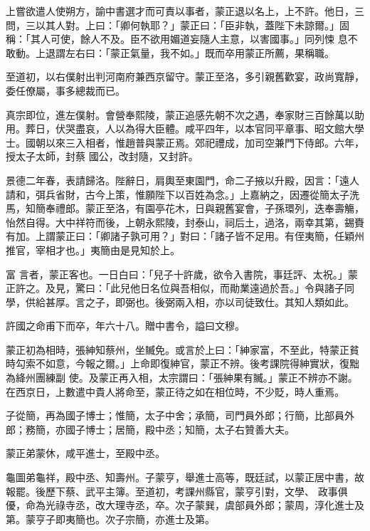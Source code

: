 \begin{pinyinscope}
 上嘗欲遣人使朔方，諭中書選才而可責以事者，蒙正退以名上，上不許。他日，三問，三以其人對。上曰：「卿何執耶？」蒙正曰：「臣非執，蓋陛下未諒爾。」固稱：「其人可使，餘人不及。臣不欲用媚道妄隨人主意，以害國事。」同列悚
 息不敢動。上退謂左右曰：「蒙正氣量，我不如。」既而卒用蒙正所薦，果稱職。



 至道初，以右僕射出判河南府兼西京留守。蒙正至洛，多引親舊歡宴，政尚寬靜，委任僚屬，事多總裁而已。



 真宗即位，進左僕射。會營奉熙陵，蒙正追感先朝不次之遇，奉家財三百餘萬以助用。葬日，伏哭盡哀，人以為得大臣體。咸平四年，以本官同平章事、昭文館大學士。國朝以來三入相者，惟趙普與蒙正焉。郊祀禮成，加司空兼門下侍郎。六年，授太子太師，封蔡
 國公，改封隨，又封許。



 景德二年春，表請歸洛。陛辭日，肩輿至東園門，命二子掖以升殿，因言：「遠人請和，弭兵省財，古今上策，惟願陛下以百姓為念。」上嘉納之，因遷從簡太子洗馬，知簡奉禮郎。蒙正至洛，有園亭花木，日與親舊宴會，子孫環列，迭奉壽觴，怡然自得。大中祥符而後，上朝永熙陵，封泰山，祠后土，過洛，兩幸其第，錫賚有加。上謂蒙正曰：「卿諸子孰可用？」對曰：「諸子皆不足用。有侄夷簡，任穎州推官，宰相才也。」夷簡由是見知於上。



 富
 言者，蒙正客也。一日白曰：「兒子十許歲，欲令入書院，事廷評、太祝。」蒙正許之。及見，驚曰：「此兒他日名位與吾相似，而勛業遠過於吾。」令與諸子同學，供給甚厚。言之子，即弼也。後弼兩入相，亦以司徒致仕。其知人類如此。



 許國之命甫下而卒，年六十八。贈中書令，謚曰文穆。



 蒙正初為相時，張紳知蔡州，坐贓免。或言於上曰：「紳家富，不至此，特蒙正貧時勾索不如意，今報之爾。」上命即復紳官，蒙正不辨。後考課院得紳實狀，復黜為絳州團練副
 使。及蒙正再入相，太宗謂曰：「張紳果有贓。」蒙正不辨亦不謝。在西京日，上數遣中貴人將命至，蒙正待之如在相位時，不少貶，時人重焉。



 子從簡，再為國子博士；惟簡，太子中舍；承簡，司門員外郎；行簡，比部員外郎；務簡，亦國子博士；居簡，殿中丞；知簡，太子右贊善大夫。



 蒙正弟蒙休，咸平進士，至殿中丞。



 龜圖弟龜祥，殿中丞、知壽州。子蒙亨，舉進士高等，既廷試，以蒙正居中書，故報罷。後歷下蔡、武平主簿。至道初，考課州縣官，蒙亨引對，文學、
 政事俱優，命為光祿寺丞，改大理寺丞，卒。次子蒙巽，虞部員外郎；蒙周，淳化進士及第。蒙亨子即夷簡也。次子宗簡，亦進士及第。




\end{pinyinscope}
